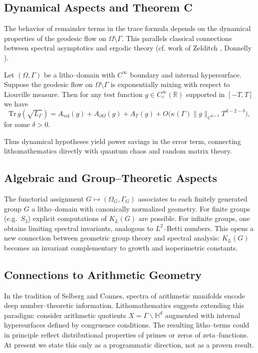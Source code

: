 \subsection{Dynamical Aspects and Theorem C}

The behavior of remainder terms in the trace formula depends 
on the dynamical properties of the geodesic flow on $\Omega\setminus \Gamma$. 
This parallels classical connections between spectral asymptotics 
and ergodic theory (cf. work of Zelditch \cite{Zelditch92}, 
Donnelly \cite{Donnelly99}). 

\begin{theorem}
Let $(\Omega,\Gamma)$ be a litho--domain with $C^\infty$ boundary 
and internal hypersurface. 
Suppose the geodesic flow on $\Omega\setminus\Gamma$ is exponentially mixing 
with respect to Liouville measure. 
Then for any test function $g\in C_c^\infty(\mathbb{R})$ supported 
in $[-T,T]$ we have
\[
\mathrm{Tr}\, g(\sqrt{L_\Gamma}) 
= A_{\mathrm{vol}}(g)+A_{\partial\Omega}(g)+A_\Gamma(g) 
+ O\!\big(\kappa(\Gamma)\|g\|_{C^{d+3}}T^{d-2-\delta}\big),
\]
for some $\delta>0$. 
\end{theorem}

Thus dynamical hypotheses yield power savings in the error term, 
connecting lithomathematics directly with quantum chaos 
and random matrix theory. 

\subsection{Algebraic and Group--Theoretic Aspects}

The functorial assignment $G \mapsto (\Omega_G,\Gamma_G)$ 
associates to each finitely generated group $G$ a litho--domain 
with canonically normalized geometry. 
For finite groups (e.g.\ $S_3$) explicit computations of $K_L(G)$ 
are possible. 
For infinite groups, one obtains limiting spectral invariants, 
analogous to $L^2$--Betti numbers. 
This opens a new connection between geometric group theory 
and spectral analysis: $K_L(G)$ becomes an invariant 
complementary to growth and isoperimetric constants. 

\subsection{Connections to Arithmetic Geometry}

In the tradition of Selberg and Connes, spectra of arithmetic manifolds 
encode deep number--theoretic information. 
Lithomathematics suggests extending this paradigm: 
consider arithmetic quotients $X=\Gamma\backslash \mathbb{H}^d$ 
augmented with internal hypersurfaces defined by congruence conditions. 
The resulting litho--terms could in principle reflect distributional 
properties of primes or zeros of zeta--functions. 
At present we state this only as a programmatic direction, 
not as a proven result. 

